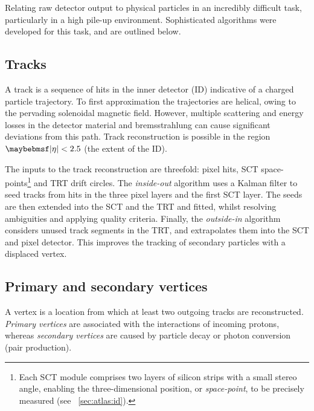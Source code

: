 
Relating raw detector output to physical particles in an incredibly difficult task,
particularly in a high pile-up environment. Sophisticated algorithms were developed for 
this task, and are outlined below.



\subsection{Tracks}
\label{sec:objects:tracks}

A track is a sequence of hits in the inner detector (ID) indicative of a charged particle 
trajectory. To first approximation the trajectories are helical, owing to the pervading 
solenoidal magnetic field. However, multiple scattering and energy losses in the detector 
material and bremsstrahlung can cause significant deviations from this path. Track 
reconstruction is possible in the region $\mods{\eta} < 2.5$ (the extent of the ID).

The inputs to the track reconstruction are threefold: pixel hits, SCT 
space-points\footnote{
	Each SCT module comprises two layers of silicon strips with a small stereo angle, 
	enabling the three-dimensional position, or \textit{space-point}, to be precisely 
	measured (see \Section~\ref{sec:atlas:id}).
}
and TRT drift circles. The \textit{inside-out} algorithm 
\cite{Tracking,ATLAS:ExpectPerf} uses a Kalman filter to seed tracks from hits in the 
three pixel layers and the first SCT layer. The seeds are then extended 
into the SCT and the TRT and fitted, whilst resolving ambiguities and applying 
quality criteria. Finally, the \textit{outside-in} algorithm \cite{Tracking} considers 
unused track segments in the TRT, and extrapolates them into the SCT and 
pixel detector. This improves the tracking of secondary particles with a displaced vertex.



\subsection{Primary and secondary vertices}
\label{sec:objects:vertices}

A vertex is a location from which at least two outgoing tracks are reconstructed. 
\textit{Primary vertices} are associated with the interactions of incoming protons, 
whereas \textit{secondary vertices} are caused by particle decay or photon conversion
(\epluseminus pair production).

